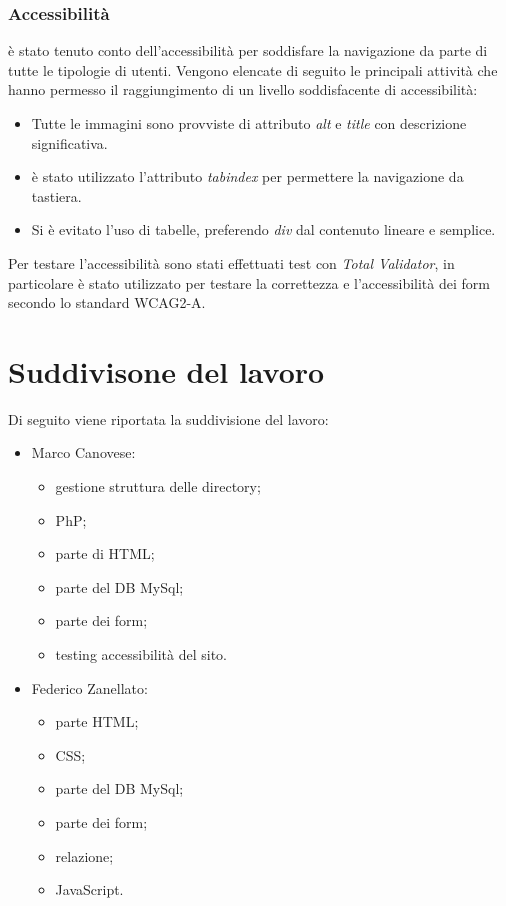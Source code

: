 \subsubsection{Accessibilità}
è stato tenuto conto dell'accessibilità per soddisfare la navigazione da parte di tutte le tipologie di utenti. Vengono elencate di seguito le principali attività che hanno permesso il raggiungimento di un livello soddisfacente di accessibilità:
\begin{itemize}
	\item Tutte le immagini sono provviste di attributo \textit{alt} e \textit{title} con descrizione significativa.
	\item è stato utilizzato l'attributo \textit{tabindex} per permettere la navigazione da tastiera.
	\item Si è evitato l'uso di tabelle, preferendo \textit{div}  dal contenuto lineare e semplice.
	
\end{itemize}
Per testare l'accessibilità sono stati effettuati test con \textit{Total Validator}, in particolare è stato utilizzato per testare la correttezza e l'accessibilità dei form secondo lo standard WCAG2-A.



\section{Suddivisone del lavoro}
Di seguito viene riportata la suddivisione del lavoro:
\begin{itemize}
	\item Marco Canovese:
	\begin{itemize}
		\item gestione struttura delle directory;
		\item PhP;
		\item parte di HTML;
		\item parte del DB MySql;
		\item parte dei form;
		\item testing accessibilità del sito.
	\end{itemize}
\end{itemize}

\begin{itemize}
	\item Federico Zanellato:
	\begin{itemize}
		\item parte HTML;
		\item CSS;
		\item parte del DB MySql;
		\item parte dei form;
		\item relazione;
		\item JavaScript.
	\end{itemize}
\end{itemize}

